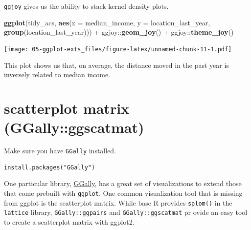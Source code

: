 \documentclass[]{book}
\newenvironment{Shaded}{\begin{snugshade}}{\end{snugshade}}
\newcommand{\KeywordTok}[1]{\textcolor[rgb]{0.13,0.29,0.53}{\textbf{{#1}}}}
\newcommand{\DataTypeTok}[1]{\textcolor[rgb]{0.13,0.29,0.53}{{#1}}}
\newcommand{\DecValTok}[1]{\textcolor[rgb]{0.00,0.00,0.81}{{#1}}}
\newcommand{\FloatTok}[1]{\textcolor[rgb]{0.00,0.00,0.81}{{#1}}}
\newcommand{\StringTok}[1]{\textcolor[rgb]{0.31,0.60,0.02}{{#1}}}
\newcommand{\NormalTok}[1]{{#1}}
\theoremstyle{definition}
\theoremstyle{definition}
\theoremstyle{remark}
\begin{document}
\texttt{ggjoy} gives us the ability to stack kernel density plots.

\begin{Shaded}
\begin{Highlighting}[]
\KeywordTok{ggplot}\NormalTok{(tidy_acs, }\KeywordTok{aes}\NormalTok{(}\DataTypeTok{x =} \NormalTok{median_income, }\DataTypeTok{y =} \NormalTok{location_last_year, }\KeywordTok{group}\NormalTok{(location_last_year))) +}
\StringTok{  }\NormalTok{ggjoy::}\KeywordTok{geom_joy}\NormalTok{() +}
\StringTok{  }\NormalTok{ggjoy::}\KeywordTok{theme_joy}\NormalTok{()}
\end{Highlighting}
\end{Shaded}

\texttt{[image: 05-ggplot-exts\_files/figure-latex/unnamed-chunk-11-1.pdf]}

This plot shows us that, on average, the distance moved in the past year
is inversely related to median income.

\section{scatterplot matrix
(GGally::ggscatmat)}\label{scatterplot-matrix-ggallyggscatmat}

Make sure you have \texttt{GGally} installed.

\begin{verbatim}
install.packages("GGally")
\end{verbatim}

One particular library, \href{http://ggobi.github.io/ggally/}{GGally},
has a great set of visualizations to extend those that come prebuilt
with \texttt{ggplot}. One common visualization tool that is missing from
ggplot is the scatterplot matrix. While base R provides \texttt{splom()}
in the \texttt{lattice} library, \texttt{GGally::ggpairs} and
\texttt{GGally::ggscatmat} pr ovide an easy tool to create a scatterplot
matrix with ggplot2.

\begin{Shaded}
\end{Shaded}
\end{document}
